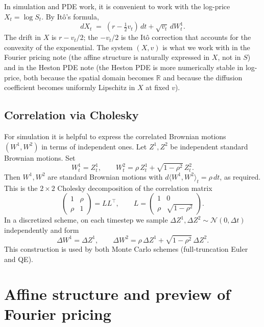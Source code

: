 \documentclass[11pt]{article}
\theoremstyle{plain}
\theoremstyle{definition}
\theoremstyle{remark}
\begin{document}
In simulation and PDE work, it is convenient to work with the log-price \(X_t = \log S_t\). By Itô's formula,
\begin{equation}
    dX_t \;=\; \left(r - \tfrac12 v_t\right)\,dt + \sqrt{v_t}\,dW^1_t.                          \label{eq:heston-X}
\end{equation}
The drift in \(X\) is \(r - v_t/2\); the \(-v_t/2\) is the Itô correction that accounts for the convexity of the exponential. The system \((X, v)\) is what we work with in the Fourier pricing note (the affine structure is naturally expressed in \(X\), not in \(S\)) and in the Heston PDE note (the Heston PDE is more numerically stable in log-price, both because the spatial domain becomes \(\mathbb{R}\) and because the diffusion coefficient becomes uniformly Lipschitz in \(X\) at fixed \(v\)).

\subsection{Correlation via Cholesky}

For simulation it is helpful to express the correlated Brownian motions \((W^1, W^2)\) in terms of independent ones. Let \(Z^1, Z^2\) be independent standard Brownian motions. Set
\begin{equation}
    W^1_t = Z^1_t, \qquad W^2_t = \rho\,Z^1_t + \sqrt{1 - \rho^2}\,Z^2_t.                       \label{eq:cholesky}
\end{equation}
Then \(W^1, W^2\) are standard Brownian motions with \(d\langle W^1, W^2\rangle_t = \rho\,dt\), as required. This is the \(2 \times 2\) Cholesky decomposition of the correlation matrix
\[
    \begin{pmatrix} 1 & \rho \\ \rho & 1 \end{pmatrix} = L L^\top, \qquad
    L = \begin{pmatrix} 1 & 0 \\ \rho & \sqrt{1 - \rho^2} \end{pmatrix}.
\]
In a discretized scheme, on each timestep we sample \(\Delta Z^1, \Delta Z^2 \sim \mathcal{N}(0, \Delta t)\) independently and form
\[
    \Delta W^1 = \Delta Z^1, \qquad \Delta W^2 = \rho\,\Delta Z^1 + \sqrt{1 - \rho^2}\,\Delta Z^2.
\]
This construction is used by both Monte Carlo schemes (full-truncation Euler and QE).

\section{Affine structure and preview of Fourier pricing}
\end{document}

